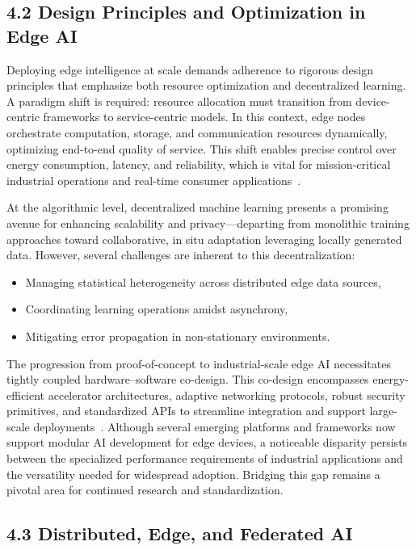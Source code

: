 \documentclass[11pt]{article}
\begin{document}
\subsection{4.2 Design Principles and Optimization in Edge AI}

Deploying edge intelligence at scale demands adherence to rigorous design principles that emphasize both resource optimization and decentralized learning. A paradigm shift is required: resource allocation must transition from device-centric frameworks to service-centric models. In this context, edge nodes orchestrate computation, storage, and communication resources dynamically, optimizing end-to-end quality of service. This shift enables precise control over energy consumption, latency, and reliability, which is vital for mission-critical industrial operations and real-time consumer applications~\cite{ref49}.

At the algorithmic level, decentralized machine learning presents a promising avenue for enhancing scalability and privacy—departing from monolithic training approaches toward collaborative, in situ adaptation leveraging locally generated data. However, several challenges are inherent to this decentralization:
\begin{itemize}
    \item Managing statistical heterogeneity across distributed edge data sources,
    \item Coordinating learning operations amidst asynchrony,
    \item Mitigating error propagation in non-stationary environments.
\end{itemize}

The progression from proof-of-concept to industrial-scale edge AI necessitates tightly coupled hardware–software co-design. This co-design encompasses energy-efficient accelerator architectures, adaptive networking protocols, robust security primitives, and standardized APIs to streamline integration and support large-scale deployments~\cite{ref49}. Although several emerging platforms and frameworks now support modular AI development for edge devices, a noticeable disparity persists between the specialized performance requirements of industrial applications and the versatility needed for widespread adoption. Bridging this gap remains a pivotal area for continued research and standardization.

\subsection{4.3 Distributed, Edge, and Federated AI}
\end{document}
